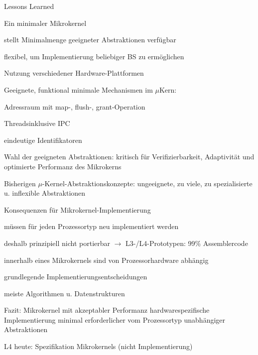 \documentclass[a4paper]{article}
\begin{document}
\begin{multicols}{3}
    Lessons Learned
    \begin{enumerate*}
        \item Ein minimaler Mikrokernel
        \begin{itemize*}
            \item stellt Minimalmenge geeigneter Abstraktionen verfügbar
            \item flexibel, um Implementierung beliebiger BS zu ermöglichen
            \item Nutzung verschiedener Hardware-Plattformen
        \end{itemize*}
        \item Geeignete, funktional minimale Mechanismen im $\mu$Kern:
        \begin{itemize*}
            \item Adressraum mit map-, flush-, grant-Operation
            \item Threadsinklusive IPC
            \item eindeutige Identifikatoren
        \end{itemize*}
        \item Wahl der geeigneten Abstraktionen: kritisch für Verifizierbarkeit, Adaptivität und optimierte Performanz des Mikrokerns
        \item Bisherigen $\mu$-Kernel-Abstraktionskonzepte: ungeeignete, zu viele, zu spezialisierte u. inflexible Abstraktionen
        \item Konsequenzen für Mikrokernel-Implementierung
        \begin{itemize*}
            \item müssen für jeden Prozessortyp neu implementiert werden
            \item deshalb prinzipiell nicht portierbar $\rightarrow$ L3-/L4-Prototypen: 99\% Assemblercode
        \end{itemize*}
        \item innerhalb eines Mikrokernels sind von Prozessorhardware abhängig
        \begin{enumerate*}
            \item grundlegende Implementierungsentscheidungen
            \item meiste Algorithmen u. Datenstrukturen
        \end{enumerate*}
        \item Fazit: Mikrokernel mit akzeptabler Performanz hardwarespezifische Implementierung minimal erforderlicher vom Prozessortyp unabhängiger Abstraktionen
        \item L4 heute: Spezifikation Mikrokernels (nicht Implementierung)
    \end{enumerate*}


\end{multicols}
\end{document}

